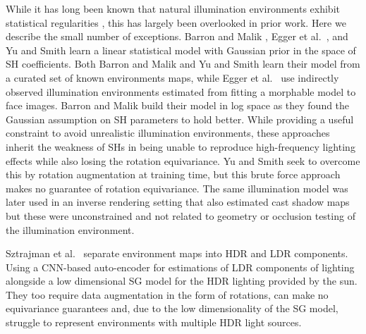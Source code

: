 While it has long been known that natural illumination environments exhibit statistical regularities \cite{dror_statistical_2004}, this has largely been overlooked in prior work. Here we describe the small number of exceptions. Barron and Malik \cite{barron2014shape}, Egger et al.~\cite{egger_occlusion-aware_2018}, and Yu and Smith \cite{yu_outdoor_2021} learn a linear statistical model with Gaussian prior in the space of SH coefficients. Both Barron and Malik \cite{barron2014shape} and Yu and Smith \cite{yu_outdoor_2021} learn their model from a curated set of known environments maps, while Egger et al.~\cite{egger_occlusion-aware_2018} use indirectly observed illumination environments estimated from fitting a morphable model to face images. Barron and Malik \cite{barron2014shape} build their model in log space as they found the Gaussian assumption on SH parameters to hold better. While providing a useful constraint to avoid unrealistic illumination environments, these approaches inherit the weakness of SHs in being unable to reproduce high-frequency lighting effects while also losing the rotation equivariance. Yu and Smith \cite{yu_outdoor_2021} seek to overcome this by rotation augmentation at training time, but this brute force approach makes no guarantee of rotation equivariance. The same illumination model was later used in an inverse rendering setting that also estimated cast shadow maps \cite{yu2022outdoor} but these were unconstrained and not related to geometry or occlusion testing of the illumination environment.

Sztrajman et al.~\cite{sztrajman_high-dynamic-range_2020} separate environment maps into HDR and LDR components. Using a CNN-based auto-encoder for estimations of LDR components of lighting alongside a low dimensional SG model for the HDR lighting provided by the sun. They too require data augmentation in the form of rotations, can make no equivariance guarantees and, due to the low dimensionality of the SG model, struggle to represent environments with multiple HDR light sources.

